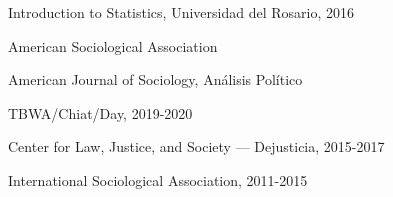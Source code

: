 \documentclass[11pt,article,oneside]{memoir}
\begin{document}
\ind \hspace{0.35in} \textemdash Introduction to Statistics, Universidad del Rosario, 2016

\normalsize

\bigskip


\medskip

\ind {} American Sociological Association\par

\ind {} American Journal of Sociology, Análisis Político\par

\bigskip

\medskip

\ind {} TBWA/Chiat/Day, 2019-2020

\ind {} Center for Law, Justice, and Society — Dejusticia, 2015-2017

\ind {} International Sociological Association, 2011-2015
\end{document}

